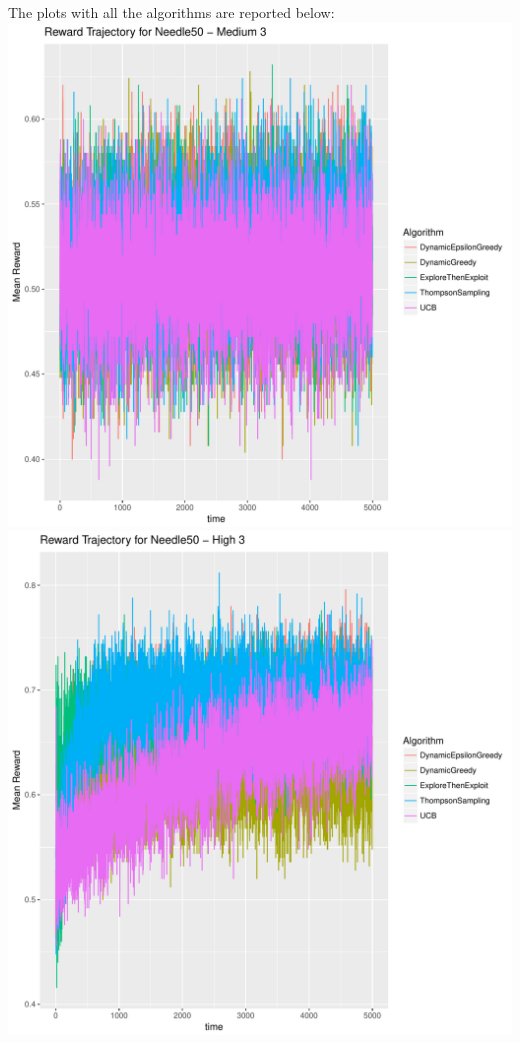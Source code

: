 \documentclass[11pt,letterpaper]{article}
\begin{document}
The plots with all the algorithms are reported below: \\
\includegraphics[scale=0.5]{"../results/Reward Trajectory for Needle50 - Medium 3"} \\
\includegraphics[scale=0.5]{"../results/Reward Trajectory for Needle50 - High 3"} \\
\end{document}
